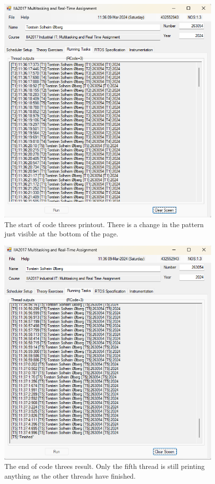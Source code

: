 \documentclass[12pt, A4paper, english]{book}
\begin{document}
				\begin{figure}
\includegraphics[width=\linewidth]{Runtime_start3}
\caption{The start of code threes printout. There is a change in the pattern just visible at the bottom of the page.}
\label{im:runtimestart3}
				\end{figure}
				\begin{figure}
\includegraphics[width=\linewidth]{Runtime_stop3}
\caption{The end of code threes result. Only the fifth thread is still printing anything as the other threads have finished.}
\label{im:runtimestop3}
				\end{figure}
\end{document}
